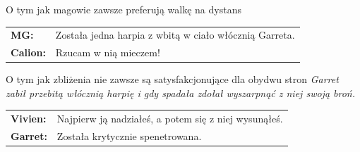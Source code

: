 \documentclass[10pt,twoside,twocolumn]{book}
\begin{document}
\begin{rpg-quotebox}{O tym jak magowie zawsze preferują walkę na dystans}
   \begin{tabularx}{\columnwidth}{lX}
      \textbf{MG:} & Została jedna harpia z wbitą w ciało włócznią Garreta.\\
      \textbf{Calion:} & Rzucam w nią mieczem!\\
   \end{tabularx}
\end{rpg-quotebox}

\begin{rpg-quotebox}{O tym jak zbliżenia nie zawsze są satysfakcjonujące dla obydwu stron}
   \textit{Garret zabił przebitą włócznią harpię i gdy spadała zdołał wyszarpnąć z niej swoją broń.}\\

   \begin{tabularx}{\columnwidth}{lX}
      \textbf{Vivien:} & Najpierw ją nadziałeś, a potem się z niej wysunąłeś.\\
      \textbf{Garret:} & Została krytycznie spenetrowana.\\
   \end{tabularx}
\end{rpg-quotebox}
% 
% 
% 
% 
% 
% 
% 
% 
% 
\end{document}
